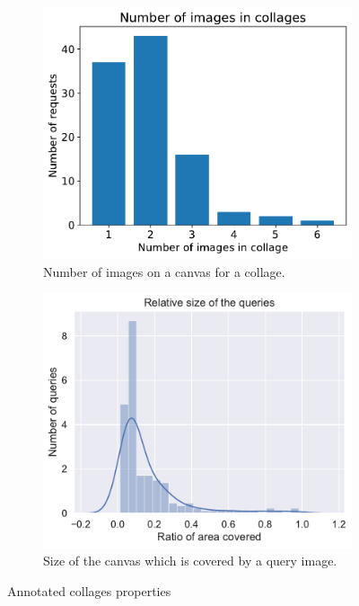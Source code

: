 \begin{figure}
     \centering
     \begin{subfigure}[b]{0.48\textwidth}
         \centering
         \includegraphics[width=\textwidth]{graphs/num_queries_in_request.pdf}
         \caption{Number of images on a canvas for a collage.}
         \label{fig:y equals x}
     \end{subfigure}
     \hfill
     \begin{subfigure}[b]{0.48\textwidth}
         \centering
         \includegraphics[width=\textwidth]{graphs/queries_size.pdf}
         \caption{Size of the canvas which is covered by a query image. }
         \label{fig:three sin x}
     \end{subfigure}
    
    \caption{Annotated collages properties}
    \label{fig:annotated_dataset}
\end{figure}


